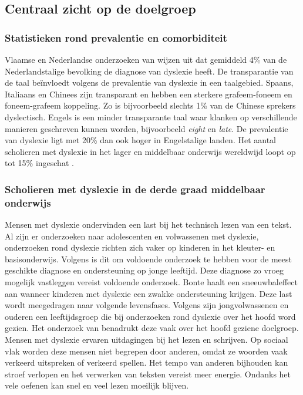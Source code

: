 \subsection{Centraal zicht op de doelgroep}

\subsubsection{Statistieken rond prevalentie en comorbiditeit}

Vlaamse en Nederlandse onderzoeken van \textcite{Wentink2008, Desoete2017} wijzen uit dat gemiddeld 4\% van de Nederlandstalige bevolking de diagnose van dyslexie heeft. De transparantie van de taal beïnvloedt volgens \textcite{APA2013} de prevalentie van dyslexie in een taalgebied. Spaans, Italiaans en Chinees zijn transparant en hebben een sterkere grafeem-foneem en foneem-grafeem koppeling. Zo is bijvoorbeeld slechts 1\% van de Chinese sprekers dyslectisch. Engels is een minder transparante taal waar 
klanken op verschillende manieren geschreven kunnen worden, bijvoorbeeld \textit{eight} en \textit{late}. De prevalentie van dyslexie ligt met 20\% dan ook hoger in Engelstalige landen. Het aantal scholieren met dyslexie in het lager en middelbaar onderwijs wereldwijd loopt op tot 15\% ingeschat \autocite{Bonte2020, VanDerMeer2022}.


\subsubsection{Scholieren met dyslexie in de derde graad middelbaar onderwijs}

Mensen met dyslexie ondervinden een last bij het technisch lezen van een tekst. Al zijn er onderzoeken naar adolescenten en volwassenen met dyslexie, onderzoeken rond dyslexie richten zich vaker op kinderen in het kleuter- en basisonderwijs. Volgens \textcite{Bonte2020} is dit om voldoende onderzoek te hebben voor de meest geschikte diagnose en ondersteuning op jonge leeftijd. Deze diagnose zo vroeg mogelijk vastleggen vereist voldoende onderzoek. Bonte haalt een sneeuwbaleffect aan wanneer kinderen met dyslexie een zwakke ondersteuning krijgen. Deze last wordt meegedragen naar volgende levensfases. Volgens \textcite{Lissens2020} zijn jongvolwassenen en ouderen een leeftijdsgroep die bij onderzoeken rond dyslexie over het hoofd word gezien. Het onderzoek van \textcite{Lissens2020} benadrukt deze vaak over het hoofd geziene doelgroep. Mensen met dyslexie ervaren uitdagingen bij het lezen en schrijven. Op sociaal vlak worden deze mensen niet begrepen door anderen, omdat ze woorden vaak verkeerd uitspreken of verkeerd spellen. Het tempo van anderen bijhouden kan stroef verlopen en het verwerken van teksten vereist meer energie. Ondanks het vele oefenen kan snel en veel lezen moeilijk blijven. 

